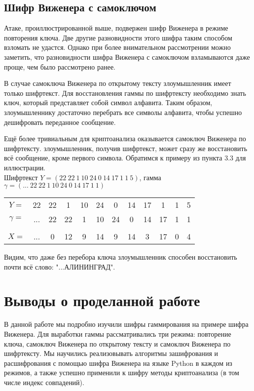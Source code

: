 \subsection{Шифр Виженера с самоключом}
Атаке, проиллюстрированной выше, подвержен шифр Виженера в режиме повторения ключа. Две другие разновидности этого шифра таким способом взломать не удастся. Однако при более внимательном рассмотрении можно заметить, что разновидности шифра Виженера с самоключом взламываются даже проще, чем было рассмотрено ранее. 

В случае самоключа Виженера по открытому тексту злоумышленник имеет только шифртекст. Для восстановления гаммы по шифртексту необходимо знать ключ, который представляет собой символ алфавита. Таким образом, злоумышленнику достаточно перебрать все символы алфавита, чтобы успешно дешифровать переданное сообщение. 

Ещё более тривиальным для криптоанализа оказывается самоключ Виженера по шифртексту. злоумышленник, получив шифртекст, может сразу же восстановить всё сообщение, кроме первого символа. Обратимся к примеру из пункта 3.3 для иллюстрации. \\
Шифртекст $Y = (22 \ 22 \ 1 \ 10 \ 24 \ 0 \ 14 \ 17 \ 1 \ 1 \ 5) $, гамма $\gamma = (... \ 22 \ 22 \ 1 \ 10 \ 24 \ 0 \ 14 \ 17 \ 1 \ 1) $
\begin{table*}[h!]
    \centering
    \begin{tabular}{c*{11}{@{\;}c}}
        $Y =$ & 22 & 22 & 1 & 10 & 24 & 0 & 14 & 17 & 1 & 1 & 5 \\[4pt]
        $\gamma =$ & ... & 22 & 22 & 1 & 10 & 24 & 0 & 14 & 17 & 1 & 1 \\[4pt]
      \hline \\ [-1.5ex]
        $X =$ & ... & 0 & 12 & 9 & 14 & 9 & 14 & 3 & 17 & 0 & 4
    \end{tabular}
\end{table*}

Видим, что даже без перебора ключа злоумышленник способен восстановить почти всё слово: "...АЛИНИНГРАД".
\newpage

\section{Выводы о проделанной работе}
В данной работе мы подробно изучили шифры гаммирования на примере шифра Виженера. Для выработки гаммы рассматривались три режима: повторение ключа, самоключ Виженера по открытому тексту и самоключ Виженера по шифртексту. Мы научились реализовывать алгоритмы зашифрования и расшифрования с помощью шифра Виженера на языке Python в каждом из режимов, а также успешно применили к шифру методы криптоанализа (в том числе индекс совпадений).

